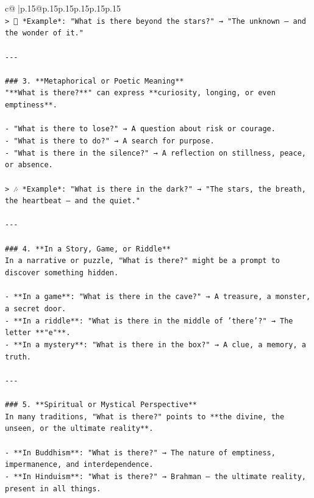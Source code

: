 \documentclass{article}
\begin{document}
{\begin{supertabular}{c@{$\;$}|p{.15\linewidth}@{}p{.15\linewidth}p{.15\linewidth}p{.15\linewidth}p{.15\linewidth}p{.15\linewidth}}
{{{\\ 
\texttt{> 🌌 *Example*: "What is there beyond the stars?" → "The unknown — and the wonder of it."} \\
\\ 
\texttt{{-}{-}{-}} \\
\\ 
\texttt{\#\#\# 3. **Metaphorical or Poetic Meaning**} \\
\texttt{"**What is there?**" can express **curiosity, longing, or even emptiness**.} \\
\\ 
\texttt{{-} "What is there to lose?" → A question about risk or courage.} \\
\texttt{{-} "What is there to do?" → A search for purpose.} \\
\texttt{{-} "What is there in the silence?" → A reflection on stillness, peace, or absence.} \\
\\ 
\texttt{> 🎶 *Example*: "What is there in the dark?" → "The stars, the breath, the heartbeat — and the quiet."} \\
\\ 
\texttt{{-}{-}{-}} \\
\\ 
\texttt{\#\#\# 4. **In a Story, Game, or Riddle**} \\
\texttt{In a narrative or puzzle, "What is there?" might be a prompt to discover something hidden.} \\
\\ 
\texttt{{-} **In a game**: "What is there in the cave?" → A treasure, a monster, a secret door.} \\
\texttt{{-} **In a riddle**: "What is there in the middle of 'there'?" → The letter **"e"**.} \\
\texttt{{-} **In a mystery**: "What is there in the box?" → A clue, a memory, a truth.} \\
\\ 
\texttt{{-}{-}{-}} \\
\\ 
\texttt{\#\#\# 5. **Spiritual or Mystical Perspective**} \\
\texttt{In many traditions, "What is there?" points to **the divine, the unseen, or the ultimate reality**.} \\
\\ 
\texttt{{-} **In Buddhism**: "What is there?" → The nature of emptiness, impermanence, and interdependence.} \\
\texttt{{-} **In Hinduism**: "What is there?" → Brahman — the ultimate reality, present in all things.} \\
}}}
\end{supertabular}}
\end{document}
